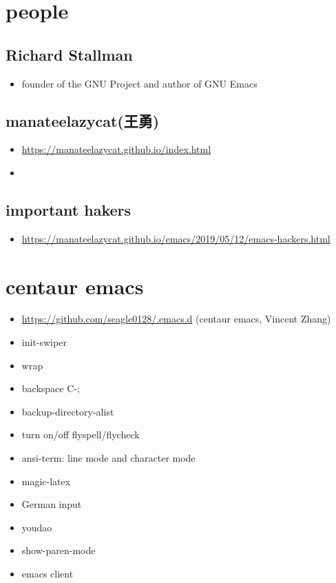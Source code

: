 \documentclass[11pt]{article}
\begin{document}
\section{people}
\label{sec:org47eb61c}
\subsection{Richard Stallman}
\label{sec:orgf74b140}
\begin{itemize}
\item founder of the GNU Project and author of GNU Emacs
\end{itemize}
\subsection{manateelazycat(王勇)}
\label{sec:org8c24e8c}
\begin{itemize}
\item \url{https://manateelazycat.github.io/index.html}
\item 
\end{itemize}
\subsection{important hakers}
\label{sec:orgeb4a7d5}
\begin{itemize}
\item \url{https://manateelazycat.github.io/emacs/2019/05/12/emacs-hackers.html}
\end{itemize}
\section{centaur emacs}
\label{sec:org9a4b5a0}
\begin{itemize}
\item \url{https://github.com/seagle0128/.emacs.d} (centaur emacs, Vincent Zhang)
\item init-swiper
\item wrap
\item backspace C-;
\item backup-directory-alist
\item turn on/off flyspell/flycheck
\item ansi-term: line mode and character mode
\item magic-latex
\item German input
\item youdao
\item show-paren-mode
\item emacs client
\end{itemize}
\end{document}
